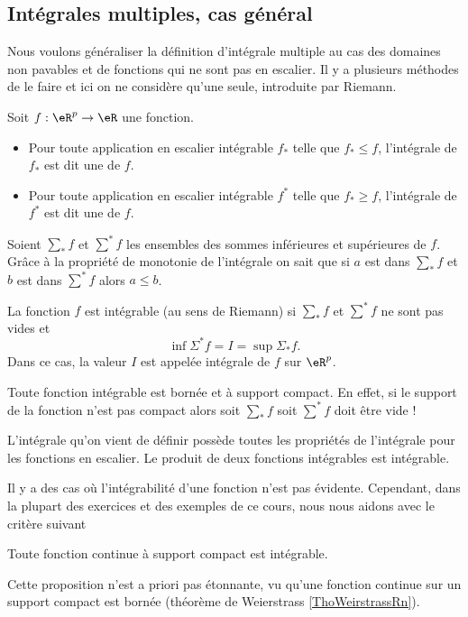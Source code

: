 \subsection{Intégrales multiples, cas général}

Nous voulons généraliser la définition d'intégrale multiple au cas des domaines non pavables et de fonctions qui ne sont pas en escalier. Il y a plusieurs méthodes de le faire et ici on ne considère qu'une seule, introduite par Riemann.  
\begin{definition} Soit $f: \eR^p\to \eR$ une fonction.
  \begin{itemize}
	  \item Pour toute application en escalier intégrable $f_*$ telle que $f_*\leq f$, l'intégrale de $f_*$ est dit une  de $f$. 
	  \item Pour toute application en escalier intégrable $f^*$ telle que $f_*\geq f$, l'intégrale de $f^*$ est dit une  de $f$. 
  \end{itemize}
\end{definition}
Soient $\sum_* f$ et  $\sum^* f$ les ensembles des sommes inférieures et supérieures de $f$. Grâce à la propriété de  monotonie de l'intégrale on sait que si $a$ est dans $\sum_* f$ et  $b$ est dans $\sum^* f$ alors $a\leq b$. 
\begin{definition}
  La fonction $f$ est intégrable (au sens de Riemann) si $\sum_* f$ et  $\sum^* f$ ne sont pas vides et 
\[
\inf \Sigma^* f=I =\sup \Sigma_* f.
\] 
Dans ce cas, la valeur $I$ est appelée intégrale de $f$ sur $\eR^p$. 
\end{definition}
\begin{remark}
  Toute fonction intégrable est bornée et à support compact. En effet, si le support de la  fonction n'est pas compact alors soit $\sum_* f$ soit $\sum^* f$ doit être vide ! 
\end{remark}
L'intégrale qu'on vient de définir possède toutes les propriétés de l'intégrale pour les fonctions en escalier. Le produit de deux fonctions intégrables est intégrable. 

Il y a des cas où l'intégrabilité d'une fonction n'est pas évidente. Cependant, dans la plupart des exercices et des exemples de ce cours, nous nous aidons avec le critère suivant 
\begin{proposition}
  Toute fonction continue à support compact est intégrable. 
\end{proposition}
Cette proposition n'est a priori pas étonnante, vu qu'une fonction continue sur un support compact est bornée (théorème de Weierstrass \ref{ThoWeirstrassRn}).

